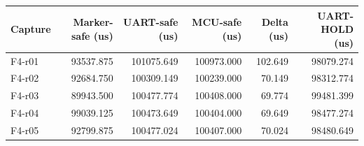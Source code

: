\begin{tabular}{lrrrrr}
Capture & Marker-safe (us) & UART-safe (us) & MCU-safe (us) & Delta (us) & UART-HOLD (us) \\
\hline
F4-r01 & 93537.875 & 101075.649 & 100973.000 & 102.649 & 98079.274 \\
F4-r02 & 92684.750 & 100309.149 & 100239.000 & 70.149 & 98312.774 \\
F4-r03 & 89943.500 & 100477.774 & 100408.000 & 69.774 & 99481.399 \\
F4-r04 & 99039.125 & 100473.649 & 100404.000 & 69.649 & 98477.274 \\
F4-r05 & 92799.875 & 100477.024 & 100407.000 & 70.024 & 98480.649 \\
\end{tabular}
